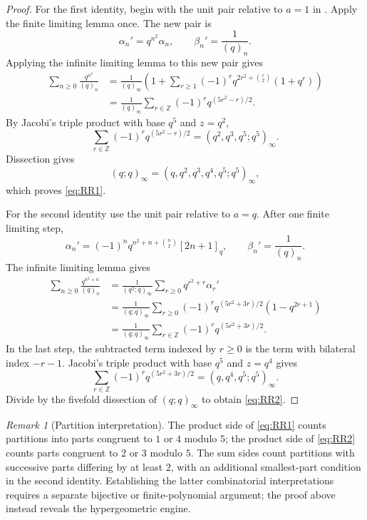 \documentclass[11pt,oneside,openany]{book}
\theoremstyle{definition}
\theoremstyle{remark}
\newtheorem{remark}[theorem]{Remark}
\newcommand{\Z}{\mathbb Z}
\begin{document}
\begin{proof}
For the first identity, begin with the unit pair relative to $a=1$ in .  Apply the finite limiting lemma once.  The new pair is
\[
 \alpha_n'=q^{n^2}\alpha_n,
 \qquad
 \beta_n'=\frac1{(q)_n}.
\]  Applying the infinite limiting lemma to this new pair gives
\begin{align*}
 \sum_{n\ge0}\frac{q^{n^2}}{(q)_n}
 &=\frac1{(q)_\infty}
 \left(1+\sum_{r\ge1}(-1)^r
 q^{2r^2+\binom r2}(1+q^r)\right)\\
 &=\frac1{(q)_\infty}
 \sum_{r\in\Z}(-1)^rq^{(5r^2-r)/2}.
\end{align*}
By Jacobi's triple product with base $q^5$ and $z=q^2$,
\[
 \sum_{r\in\Z}(-1)^rq^{(5r^2-r)/2}
 =(q^2,q^3,q^5;q^5)_\infty.
\]
Dissection gives
\[
 (q;q)_\infty=(q,q^2,q^3,q^4,q^5;q^5)_\infty,
\]
which proves \eqref{eq:RR1}.

For the second identity use the unit pair relative to $a=q$.  After one finite limiting step,
\[
 \alpha_n'=(-1)^nq^{n^2+n+\binom n2}[2n+1]_q,
 \qquad
 \beta_n'=\frac1{(q)_n}.
\]
The infinite limiting lemma gives
\begin{align*}
 \sum_{n\ge0}\frac{q^{n^2+n}}{(q)_n}
 &=\frac1{(q^2;q)_\infty}
 \sum_{r\ge0}q^{r^2+r}\alpha_r'\\
 &=\frac1{(q;q)_\infty}
 \sum_{r\ge0}(-1)^rq^{(5r^2+3r)/2}(1-q^{2r+1})\\
 &=\frac1{(q;q)_\infty}
 \sum_{r\in\Z}(-1)^rq^{(5r^2+3r)/2}.
\end{align*}
In the last step, the subtracted term indexed by $r\ge0$ is the term with bilateral index $-r-1$.  Jacobi's triple product with base $q^5$ and $z=q^4$ gives
\[
 \sum_{r\in\Z}(-1)^rq^{(5r^2+3r)/2}
 =(q,q^4,q^5;q^5)_\infty.
\]
Divide by the fivefold dissection of $(q;q)_\infty$ to obtain \eqref{eq:RR2}.
\end{proof}

\begin{remark}[Partition interpretation]
The product side of \eqref{eq:RR1} counts partitions into parts congruent to $1$ or $4$ modulo $5$; the product side of \eqref{eq:RR2} counts parts congruent to $2$ or $3$ modulo $5$.  The sum sides count partitions with successive parts differing by at least $2$, with an additional smallest-part condition in the second identity.  Establishing the latter combinatorial interpretations requires a separate bijective or finite-polynomial argument; the proof above instead reveals the hypergeometric engine.
\end{remark}
\end{document}
